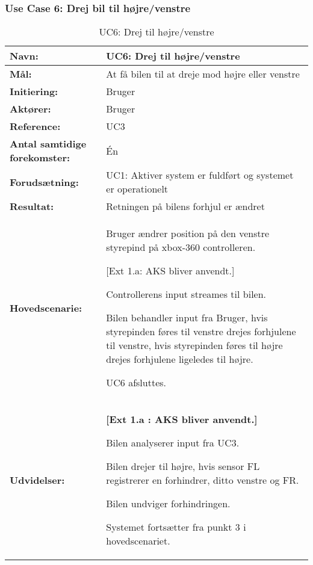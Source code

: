 \subsubsection{Use Case 6: Drej bil til højre/venstre}
\begin{table}[h]
\begin{tabularx}{\textwidth}{| L{3.3 cm} | Z |} 													   \hline

\textbf{Navn:} 						& UC6: Drej til højre/venstre									\\ \hline
\textbf{Mål:}						& At få bilen til at dreje mod højre eller venstre				\\ \hline
\textbf{Initiering:}				& Bruger 														\\ \hline
\textbf{Aktører:} 					& Bruger	 													\\ \hline
\textbf{Reference:} 				& UC3 															\\ \hline
\textbf{Antal samtidige forekomster:} & Én 															\\ \hline
\textbf{Forudsætning:} 				& UC1: Aktiver system er fuldført og systemet er operationelt   \\ \hline
\textbf{Resultat:}					& Retningen på bilens forhjul er ændret 						\\ \hline
\textbf{Hovedscenarie:}				& 

\begin{packed_enum}
\item Bruger ændrer position på den venstre styrepind på xbox-360 controlleren.
	\begin{packed_item}\itemsep1pt \parskip0pt 
		\item {[}Ext 1.a: AKS bliver anvendt.{]}
	\end{packed_item}
	\item Controllerens input streames til bilen.
	\item Bilen behandler input fra Bruger, hvis styrepinden føres til venstre drejes forhjulene til venstre, hvis styrepinden føres til højre drejes forhjulene ligeledes til højre.
	\item UC6 afsluttes.
\end{packed_enum} \\ \hline
\textbf{Udvidelser:}				&  
\textbf{{[}Ext 1.a : AKS bliver anvendt.{]}}
	\begin{packed_enum}\itemsep1pt \parskip0pt 
		\item Bilen analyserer input fra UC3.
		\item Bilen drejer til højre, hvis sensor FL registrerer en forhindrer, ditto venstre og FR.
		\item Bilen undviger forhindringen.
		\item Systemet fortsætter fra punkt 3 i hovedscenariet.
	\end{packed_enum}																				\\ \hline
\end{tabularx}
\caption{UC6: Drej til højre/venstre}
\label{tbl:UC6}
\end{table}
